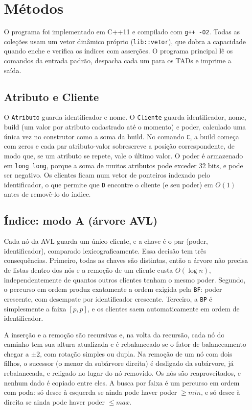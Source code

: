 \documentclass[letterpaper]{article} %
\begin{document}
\section{M\'etodos}

O programa foi implementado em C++11 e compilado com \texttt{g++ -O2}. Todas as cole\c{c}\~oes usam um vetor din\^amico pr\'oprio (\texttt{lib::vetor}), que dobra a capacidade quando enche e verifica os \'indices com asser\c{c}\~oes. O programa principal l\^e os comandos da entrada padr\~ao, despacha cada um para os TADs e imprime a sa\'ida.

\subsection{Atributo e Cliente}

O \texttt{Atributo} guarda identificador e nome. O \texttt{Cliente} guarda identificador, nome, build (um valor por atributo cadastrado at\'e o momento) e poder, calculado uma \'unica vez no construtor como a soma da build. No comando \texttt{C}, a build come\c{c}a com zeros e cada par atributo-valor sobrescreve a posi\c{c}\~ao correspondente, de modo que, se um atributo se repete, vale o \'ultimo valor. O poder \'e armazenado em \texttt{long long}, porque a soma de muitos atributos pode exceder 32 bits, e pode ser negativo. Os clientes ficam num vetor de ponteiros indexado pelo identificador, o que permite que \texttt{D} encontre o cliente (e seu poder) em $O(1)$ antes de remov\^e-lo do \'indice.

\subsection{\'Indice: modo A (\'arvore AVL)}

Cada n\'o da AVL guarda um \'unico cliente, e a chave \'e o par (poder, identificador), comparado lexicograficamente. Essa decis\~ao tem tr\^es consequ\^encias. Primeiro, todas as chaves s\~ao distintas, ent\~ao a \'arvore n\~ao precisa de listas dentro dos n\'os e a remo\c{c}\~ao de um cliente custa $O(\log n)$, independentemente de quantos outros clientes tenham o mesmo poder. Segundo, o percurso em ordem produz exatamente a ordem exigida pela \texttt{BF}: poder crescente, com desempate por identificador crescente. Terceiro, a \texttt{BP} \'e simplesmente a faixa $[p, p]$, e os clientes saem automaticamente em ordem de identificador.

A inser\c{c}\~ao e a remo\c{c}\~ao s\~ao recursivas e, na volta da recurs\~ao, cada n\'o do caminho tem sua altura atualizada e \'e rebalanceado se o fator de balanceamento chegar a $\pm2$, com rota\c{c}\~ao simples ou dupla. Na remo\c{c}\~ao de um n\'o com dois filhos, o sucessor (o menor da sub\'arvore direita) \'e desligado da sub\'arvore, j\'a rebalanceada, e religado no lugar do n\'o removido. Os n\'os s\~ao reaproveitados, e nenhum dado \'e copiado entre eles. A busca por faixa \'e um percurso em ordem com poda: s\'o desce \`a esquerda se ainda pode haver poder $\ge min$, e s\'o desce \`a direita se ainda pode haver poder $\le max$.
\end{document}

